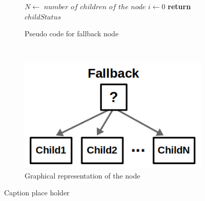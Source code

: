 \begin{figure}[H]
  \centering
  \begin{subfigure}[t]{0.6\textwidth}
      \begin{algorithm}[H]
        $N \gets $ $number$ $of$ $children$ $of$ $the$ $node$\;
        $i \gets 0$\;
        \textbf{return} $childStatus$
    \end{algorithm}
    
      \caption{Pseudo code for fallback node}\label{alg:fal}
  \end{subfigure}%
  ~ 
  \begin{subfigure}[t]{0.3\textwidth}
      \centering
      \includegraphics{figs/bt_fallback_node.png}
      \caption{Graphical representation of the node}
      \label{fig:fal}
  \end{subfigure}
  \caption{Caption place holder}
\end{figure}